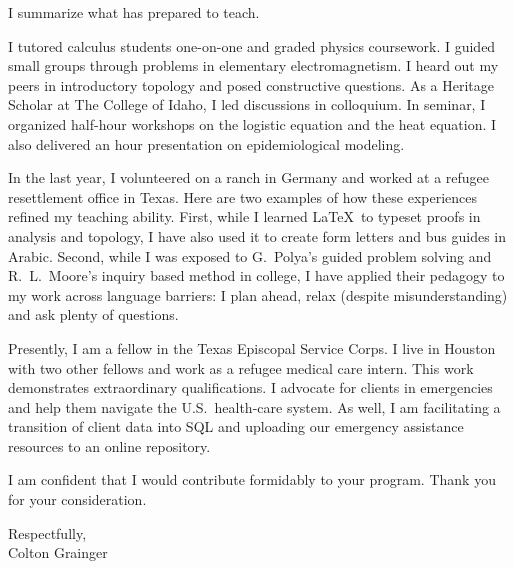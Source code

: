 \documentclass[10pt]{letter}
\newcommand{\term}[1]{\textmd{#1}}
\begin{document}
\begin{letter}{
}
I summarize what has prepared to teach. 
\begin{description}[topsep=0pt]
	\item[Tutoring \& Grading] I \term{tutored calculus students} one-on-one and \term{graded physics coursework}. I guided small groups through problems in elementary electromagnetism. I heard out my peers in introductory topology and posed constructive questions. As a Heritage Scholar at The College of Idaho, I led discussions in colloquium. In seminar, I organized half-hour workshops on the logistic equation and the heat equation. I also delivered an hour presentation on \term{epidemiological modeling}. 
	\item[Time Away from School] In the last year, I volunteered on a ranch in Germany and worked at a refugee resettlement office in Texas. Here are two examples of how these experiences refined my teaching ability. First, while I learned \LaTeX\ to typeset proofs in analysis and topology, I have also used it to create form letters and bus guides in Arabic. Second, while I was exposed to G.~Polya's guided problem solving and R.~L.~Moore's inquiry based method in college, I have applied their pedagogy to my work across language barriers: I plan ahead, relax (despite misunderstanding) and ask plenty of questions.
\end{description}

Presently, I am a fellow in the Texas Episcopal Service Corps. I live in Houston with two other fellows and work as a refugee medical care intern. This work demonstrates extraordinary qualifications. I advocate for clients in emergencies and help them navigate the U.S.\ health-care system. As well, I am facilitating a transition of client data into SQL and uploading our emergency assistance resources to an online repository.

I am confident that I would contribute formidably to your program. Thank you for your consideration.

\closing{Respectfully,\\Colton Grainger}
\end{letter}
\end{document}
